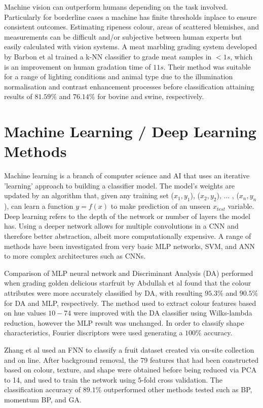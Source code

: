 \documentclass[fleqn,twoside,12pt]{report}
\begin{document}
Machine vision can outperform humans depending on the task involved. Particularly for borderline cases a machine has finite thresholds inplace to ensure consistent outcomes. Estimating ripeness colour, areas of scattered blemishes, and measurements can be difficult and/or subjective between human experts but easily calculated with vision systems. A meat marbling grading system developed by Barbon et al \cite{barbon} trained a k-NN classifier to grade meat samples in $<1s$, which is an improvement on human gradation time of $11s$. Their method was suitable for a range of lighting conditions and animal type due to the illumination normalisation and contrast enhancement processes before classification attaining results of $81.59\%$ and $76.14\%$ for bovine and swine, respectively. 



\section{Machine Learning / Deep Learning Methods}


Machine learning is a branch of computer science and AI that uses an iterative 'learning' approach to building a classifier model. The model's weights are updated by an algorithm that, given any training set ($x_1, y_1$), ($x_2, y_2$), ... , ($x_n, y_n$), can learn a function $y = f(x)$ to make prediction of an unseen $x_{test}$ variable. Deep learning refers to the depth of the network or number of layers the model has. Using a deeper network allows for multiple convolutions in a CNN and therefore better abstraction, albeit more computationally expensive. A range of methods have been investigated from very basic MLP networks, SVM, and ANN to more complex architectures such as CNNs.


Comparison of MLP neural network and Discriminant Analysis (DA) performed when grading golden delicious starfruit by Abdullah et al \cite{abdullah} found that the colour attributes were more accurately classified by DA, with resulting $95.3\%$ and $90.5\%$ for DA and MLP, respectively. The method used to extract colour features based on hue values $10-74$ were improved with the DA classifier using Wilks-lambda reduction, however the MLP result was unchanged. In order to classify shape characteristics, Fourier discriptors were used generating a $100\%$ accuracy.


Zhang et al \cite{zhang} used an FNN to classify a fruit dataset created via on-site collection and on line. After background removal, the 79 features that had been constructed based on colour, texture, and shape were obtained before being reduced via PCA to 14, and used to train the network using 5-fold cross validation. The classification accuracy of $89.1\%$ outperformed other methods tested such as BP, momentum BP, and GA. 
\end{document}
